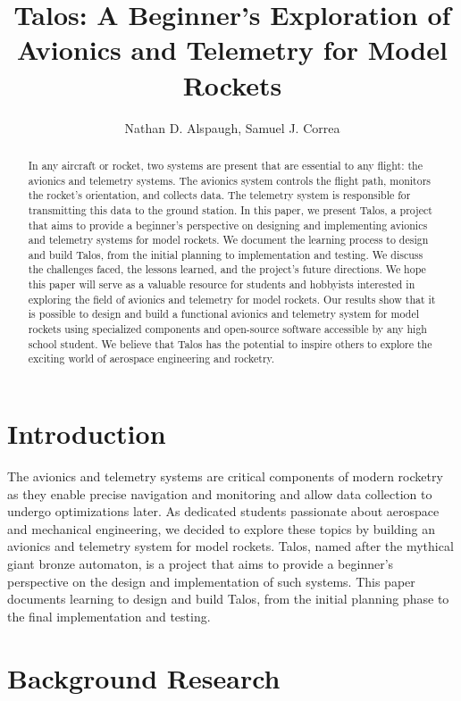\documentclass{article}
\title{Talos: A Beginner's Exploration of Avionics and Telemetry for Model Rockets}
\author{Nathan D. Alspaugh, Samuel J. Correa}
\begin{document}
\maketitle

\begin{abstract}
      In any aircraft or rocket, two systems are present that are essential to any flight: the avionics and telemetry systems. The avionics system controls the flight path, monitors the rocket's orientation, and collects data. The telemetry system is responsible for transmitting this data to the ground station. In this paper, we present Talos, a project that aims to provide a beginner's perspective on designing and implementing avionics and telemetry systems for model rockets. We document the learning process to design and build Talos, from the initial planning to implementation and testing. We discuss the challenges faced, the lessons learned, and the project's future directions. We hope this paper will serve as a valuable resource for students and hobbyists interested in exploring the field of avionics and telemetry for model rockets. Our results show that it is possible to design and build a functional avionics and telemetry system for model rockets using specialized components and open-source software accessible by any high school student. We believe that Talos has the potential to inspire others to explore the exciting world of aerospace engineering and rocketry.
\end{abstract}

\section{Introduction}

The avionics and telemetry systems are critical components of modern rocketry as they enable precise navigation and monitoring and allow data collection to undergo optimizations later. As dedicated students passionate about aerospace and mechanical engineering, we decided to explore these topics by building an avionics and telemetry system for model rockets. Talos, named after the mythical giant bronze automaton, is a project that aims to provide a beginner's perspective on the design and implementation of such systems. This paper documents learning to design and build Talos, from the initial planning phase to the final implementation and testing.

\section{Background Research}
\end{document}
